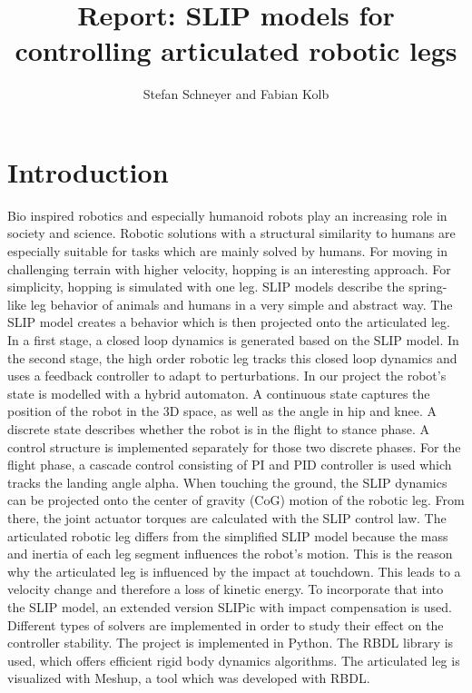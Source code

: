 \documentclass[journal,onecolumn]{IEEEtran}
\begin{document}
	\title{Report: SLIP models for controlling articulated robotic legs}
	
	
	\author{Stefan Schneyer and Fabian Kolb \vspace{0.25cm}
		\\}

	\maketitle
	

	\IEEEpeerreviewmaketitle
	
	
	
	\section{Introduction}
	\label{sec:Introduction}
	
	
	Bio inspired robotics and especially humanoid robots play an increasing role in society and science. Robotic solutions with a structural 
	similarity to humans are especially suitable for tasks which are mainly solved by humans. For moving in challenging terrain with higher velocity,
	hopping is an interesting approach. For simplicity, hopping is simulated with one leg. SLIP models describe the spring-like leg behavior
	of animals and humans in a very simple and abstract way. The SLIP model creates a behavior which is then projected onto the articulated leg. 
	In a first stage, a closed loop dynamics is generated based on the SLIP model. In the second stage, the high order robotic leg tracks this closed loop dynamics 
	and uses a feedback controller to adapt to perturbations. In our project the robot's state is modelled with a hybrid automaton. 
	A continuous state captures the position of the robot in the 3D space, as well as the angle in hip and knee. A discrete state describes whether the robot is 
	in the flight to stance phase. A control structure is implemented separately for those two discrete phases. 
	For the flight phase, a cascade control consisting of PI and PID controller is used which tracks the landing angle alpha. When touching the ground, the SLIP dynamics 
	can be projected onto the center of gravity (CoG) motion of the robotic leg. From there, the joint actuator torques are calculated with the SLIP control law. The articulated robotic leg 
	differs from the simplified SLIP model because the mass and inertia of each leg segment influences the robot's motion. This is the reason why the articulated 
	leg is influenced by the impact at touchdown. This leads to a velocity change and therefore a loss of kinetic energy. To incorporate that into the SLIP model, an extended 
	version SLIPic with impact compensation is used. Different types of solvers are implemented in order to study their effect on the controller stability. 
	The project is implemented in Python. The RBDL library is used, which offers efficient rigid body dynamics algorithms. The articulated leg is visualized with Meshup, 
	a tool which was developed with RBDL.
	
\end{document}
